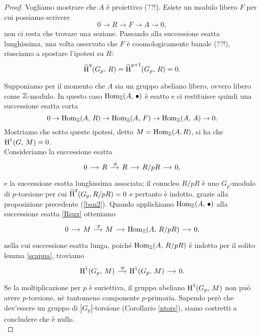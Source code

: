 \begin{proof}
	Vogliamo mostrare che $ A $ è proiettivo (??!). Esiste un modulo libero $ F $ per cui possiamo scrivere
	\begin{equation}\label{projban3}
		0 \to R \to F \to A \to 0,
	\end{equation}
	non ci resta che trovare una sezione.
	Passando alla successione esatta lunghissima, una volta osservato che $ F $ è coomologicamente banale (??!), riusciamo a spostare l'ipotesi su $ R $:
	\[ \operatorname{\widehat{H}}^q(G_p, \, R) = \operatorname{\widehat{H}}^{q+1}(G_p, \, R) = 0. \]
	
	Supponiamo per il momento che $ A $ sia un gruppo abeliano libero, ovvero libero come $ \mathbb{Z} $-modulo. In questo caso $ \operatorname{Hom}_{\mathbb{Z}}(A, \, \bullet) $ è esatto e ci restituisce quindi una successione esatta corta
	\begin{equation}\label{homban3}
		0 \to \operatorname{Hom}_{\mathbb{Z}}(A, \, R) \to \operatorname{Hom}_{\mathbb{Z}}(A, \, F) \to \operatorname{Hom}_{\mathbb{Z}}(A, \, A) \to 0.
	\end{equation}
	Mostriamo che sotto queste ipotesi, detto $ M = \operatorname{Hom}_{\mathbb{Z}}(A, R) $, si ha che $ \operatorname{H}^1(G, \, M) = 0 $. \\
	
	Consideriamo la successione esatta
	\begin{equation}\label{Rsux}
		\begin{tikzcd}[column sep = small]
		0 \rar & R \rar["\cdot p"] & R \rar & R/pR \rar & 0,
		\end{tikzcd}
	\end{equation}
	e la successione esatta lunghissima associata; il conucleo $ R/pR $ è uno $ G_p $-modulo di $ p $-torsione per cui $ \operatorname{\widehat{H}}^{q}(G_p, R/pR) = 0 $ e pertanto è indotto, grazie alla proposizione precedente (\ref{ban2}). Quando applichiamo $ \operatorname{Hom}_{\mathbb{Z}}(A, \, \bullet) $ alla successione esatta \ref{Rsux} otteniamo
	\begin{equation*}
		\begin{tikzcd}[column sep = small]
		0 \rar & M \rar["\cdot p"] & M \rar & \Hom_\Z(A, \, R/pR) \rar & 0,
		\end{tikzcd}
	\end{equation*}
	nella cui successione esatta lunga, poiché $ \operatorname{Hom}_{\mathbb{Z}}(A, \, R/pR) $ è indotto per il solito lemma \ref{scappa}, troviamo
	\[ \begin{tikzcd}[column sep = small]
	\HH^1(G_p, \, M) \rar["\cdot p"] & \HH^1(G_p, \, M) \rar & 0.
	\end{tikzcd}  \]
	Se la moltiplicazione per $ p $ è suriettiva, il gruppo abeliano $ \operatorname{H}^1(G_p, \, M) $ non può avere $ p $-torsione, nè tantomeno componente $ p $-primaria. Sapendo però che dev'essere un gruppo di $ |G_p | $-torsione (Corollario \ref{ntors}), siamo costretti a concludere che è nullo. \\
	

\end{proof}

